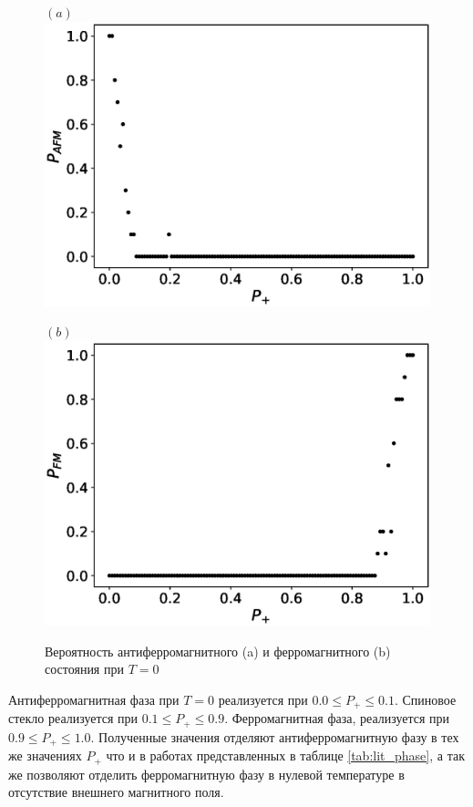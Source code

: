 \documentclass[utf8, babel, sor, jor, amsmath, amssymb, reprint]{elsarticle} %
\begin{document}
\begin{figure}[H]
	\begin{minipage}[h]{0.45\linewidth}
		\centering $(a)$
		\includegraphics[width=1\linewidth]{images/P_AFM_Mmax.eps}
	\end{minipage}
	\hfill
	\begin{minipage}[h]{0.45\linewidth}
		\centering $(b)$
		\includegraphics[width=1\linewidth]{images/P_FM_Mmax.eps}
	\end{minipage}
	\caption{Вероятность антиферромагнитного (a) и ферромагнитного (b) состояния при $T = 0$}
	\label{fig:P_AFM_FM_Mmax}
\end{figure}

Антиферромагнитная фаза при $T = 0$ реализуется при $0.0 \leq P_+ \leq 0.1$. Спиновое стекло реализуется при $0.1 \leq P_+ \leq 0.9$. Ферромагнитная фаза, реализуется при $0.9 \leq P_+ \leq 1.0$. Полученные значения отделяют антиферромагнитную фазу в тех же значениях $P_+$ что и в работах представленных в таблице \ref{tab:lit_phase}, а так же позволяют отделить ферромагнитную фазу в нулевой температуре в отсутствие внешнего магнитного поля.
\end{document}
